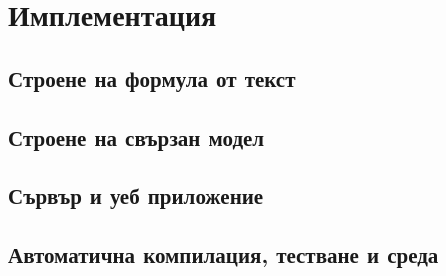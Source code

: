\documentclass[14pt, aspectratio=169]{beamer}
\begin{document}
\section{Имплементация}
\subsection{Строене на формула от текст}
\subsection{Строене на свързан модел}
\subsection{Сървър и уеб приложение}
\subsection{Автоматична компилация, тестване и среда}
\end{document}
